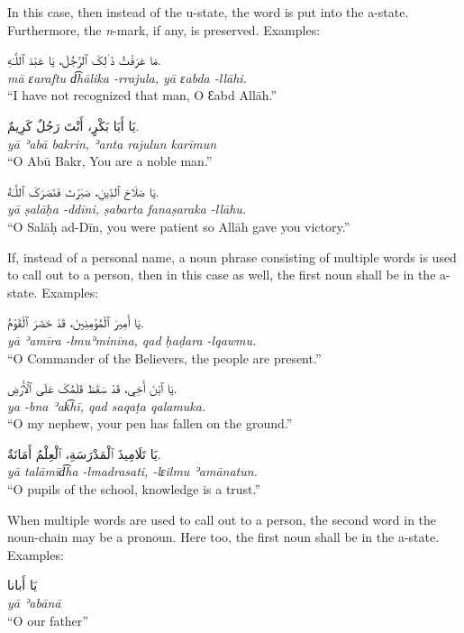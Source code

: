 \documentclass[
  10pt,
]{book}
\begin{document}
In this case, then instead of the u-state, the word is put into the a-state. Furthermore, the \emph{n}-mark, if any, is preserved. Examples:

\foreignlanguage{arabic}{مَا عَرَفْتُ ذَ ٰلِکَ ٱلرَّجُلَ، يَا عَبْدَ ٱللَّـٰهِ.}\\
\emph{mā ɛaraftu d͡hālika -rrajula, yā ɛabda -llāhi.}\\
\enquote{I have not recognized that man, O Ɛabd Allāh.}

\foreignlanguage{arabic}{يَا أَبَا بَکْرٍ، أَنْتَ رَجُلٌ کَرِيمٌ.}\\
\emph{yā ʾabā bakrin, ʾanta rajulun karīmun}\\
\enquote{O Abū Bakr, You are a noble man.}

\foreignlanguage{arabic}{يَا صَلَاحَ ٱلدِّينِ، صَبَرْتَ فَنَصَرَکَ ٱللَّـٰهُ.}\\
\emph{yā ṣalāḥa -ddīni, ṣabarta fanaṣaraka -llāhu.}\\
\enquote{O Salāḥ ad-Dīn, you were patient so Allāh gave you victory.}

If, instead of a personal name, a noun phrase consisting of multiple words is used to call out to a person, then in this case as well, the first noun shall be in the a-state. Examples:

\foreignlanguage{arabic}{يَا أَمِيرَ ٱلْمُؤمِنِينَ، قَدْ حَضَرَ ٱلْقَوْمُ.}\\
\emph{yā ʾamīra -lmuʾminīna, qad ḥaḍara -lqawmu.}\\
\enquote{O Commander of the Believers, the people are present.}

\foreignlanguage{arabic}{يَا ٱبْنَ أَخِي، قَدْ سَقَطَ قَلَمُکَ عَلَى ٱلْأَرْضِ.}\\
\emph{ya -bna ʾak͡hī, qad saqaṭa qalamuka.}\\
\enquote{O my nephew, your pen has fallen on the ground.}

\foreignlanguage{arabic}{يَا تَلَامِيذَ ٱلْمَدْرَسَةِ، ٱلْعِلْمُ أَمَانَةٌ.}\\
\emph{yā talāmīd͡ha -lmadrasati, -lɛilmu ʾamānatun.}\\
\enquote{O pupils of the school, knowledge is a trust.}

When multiple words are used to call out to a person, the second word in the noun-chain may be a pronoun. Here too, the first noun shall be in the a-state. Examples:

\foreignlanguage{arabic}{يَا أَبانا}\\
\emph{yā ʾabānā}\\
\enquote{O our father}
\end{document}
